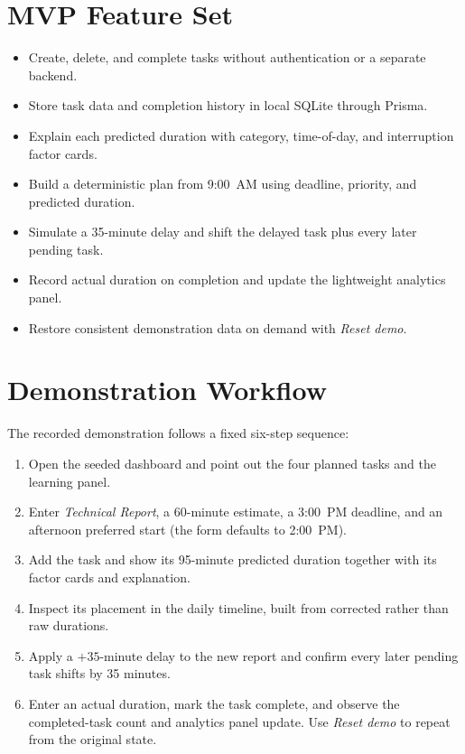 \documentclass[11pt,a4paper]{article}
\begin{document}
\section{MVP Feature Set}
\begin{itemize}
    \item Create, delete, and complete tasks without authentication or a separate backend.
    \item Store task data and completion history in local SQLite through Prisma.
    \item Explain each predicted duration with category, time-of-day, and interruption factor cards.
    \item Build a deterministic plan from 9:00~AM using deadline, priority, and predicted duration.
    \item Simulate a 35-minute delay and shift the delayed task plus every later pending task.
    \item Record actual duration on completion and update the lightweight analytics panel.
    \item Restore consistent demonstration data on demand with \emph{Reset demo}.
\end{itemize}

\section{Demonstration Workflow}
The recorded demonstration follows a fixed six-step sequence:
\begin{enumerate}
    \item Open the seeded dashboard and point out the four planned tasks and the learning panel.
    \item Enter \emph{Technical Report}, a 60-minute estimate, a 3:00~PM deadline, and an afternoon
    preferred start (the form defaults to 2:00~PM).
    \item Add the task and show its 95-minute predicted duration together with its factor cards and
    explanation.
    \item Inspect its placement in the daily timeline, built from corrected rather than raw durations.
    \item Apply a $+35$-minute delay to the new report and confirm every later pending task shifts by
    35 minutes.
    \item Enter an actual duration, mark the task complete, and observe the completed-task count and
    analytics panel update. Use \emph{Reset demo} to repeat from the original state.
\end{enumerate}
\end{document}
